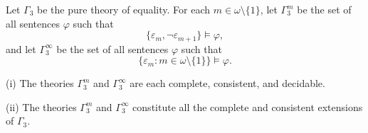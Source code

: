 Let $\Gamma_3$ be the pure theory of equality. For each $m \in \omega \setminus \{1\}$, let $\Gamma_3^m$ be the set of all sentences $\varphi$ such that
$$\{\varepsilon_m, \neg \varepsilon_{m+1}\} \models \varphi,$$
and let $\Gamma_3^\infty$ be the set of all sentences $\varphi$ such that
$$\{\varepsilon_m : m \in \omega \setminus \{1\}\} \models \varphi.$$

(i) The theories $\Gamma_3^m$ and $\Gamma_3^\infty$ are each complete, consistent, and decidable.

(ii) The theories $\Gamma_3^m$ and $\Gamma_3^\infty$ constitute all the complete and consistent extensions of $\Gamma_3$.
